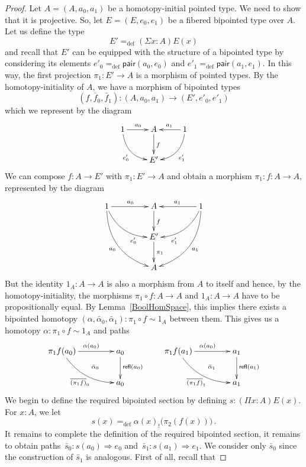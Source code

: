 \documentclass[10pt,a4paper,oneside,reqno]{amsart}
\numberwithin{equation}{section}
\theoremstyle{mythm}
\theoremstyle{mydef}
\theoremstyle{myrmk}
\newcommand{\peq}{\Rightarrow}
\newcommand{\defeq}{=_{\mathrm{def}}}
\newcommand{\co}{\colon}
\newcommand{\pair}{\mathsf{pair}}
\newcommand{\refl}{\mathsf{refl}}
\begin{document}
\begin{proof}
Let $A = (A, a_0, a_1)$ be a homotopy-initial pointed type. We need to show that it is projective. So, let $E = (E, e_0, e_1)$ be a fibered 
bipointed type over $A$. Let us define the type 
\[
E' \defeq (\Sigma x \co A) E(x) 
\]
and recall that $E'$ can be equipped with the structure of a bipointed type by considering its elements $e'_0 \defeq \pair(a_0, e_0)$ and $e'_1 \defeq \pair(a_1, e_1)$. In this way,  the first projection $\pi_1 \co E' \to A$ is a morphism of pointed types. By the homotopy-initiality of $A$, we have a morphism of bipointed types
\[
(f, \bar{f}_0, \bar{f}_1) \co (A, a_0, a_1)  \to (E', e'_0, e'_1) 
\]
which we represent by the diagram
\[
\xymatrix{
1 \ar@/_1pc/[dr]_{e'_0} \ar[r]^{a_0} & A  \ar[d]^f & 1 \ar[l]_{a_1} \ar@/^1pc/[dl]^{e'_1} \\
 & E' & }
 \]
 We can compose $f \co A \to E'$ with $\pi_1 \co E' \to A$ and obtain a morphism $\pi_1 \co f \co A \to A$, represented by the diagram
  \[
\xymatrix@C=1.5cm{
1 \ar@/_1pc/[dr]_(.7){e'_0} \ar[r]^{a_0} \ar@/_1.5pc/[ddr]_{a_0}  & A  \ar[d]^f & 1 \ar[l]_{a_1} \ar@/^1pc/[dl]^(.7){e'_1} \ar@/^1.5pc/[ddl]^{a_1}  \\
 & E' \ar[d]^{\pi_1} & \\
 & A &  }
 \]
But the identity $1_A \co A \to A$ is also a morphism from $A$ to itself and hence, by the homotopy-initiality, the morphisms $\pi_1 \circ f \co A \to A$
and $1_A \co A \to A$ have to be propositionally equal. By Lemma~\ref{BoolHomSpace}, this implies there exists a bipointed homotopy $(\alpha,
\bar{\alpha}_0,\bar{\alpha}_1) \co \pi_1 \circ f \sim 1_A$ between them. This gives us a homotopy $\alpha \co \pi_1 \circ f \sim 1_A$ and paths
\[
\xymatrix@C=1.5cm{
\pi_1 f (a_0) \ar[r]^{\alpha(a_0)} \ar@/_1pc/[dr]_{\overline{(\pi_1 f)}_0} \ar@{}[dr]|{\quad \bar{\alpha}_0}  & a_0 \ar[d]^{\refl(a_0)} \\
 & a_0 } \qquad
 \xymatrix@C=1.5cm{
\pi_1 f (a_1) \ar[r]^{\alpha(a_0)} \ar@/_1pc/[dr]_{\overline{(\pi_1 f)}_1} \ar@{}[dr]|{\quad \bar{\alpha}_1}  & a_1 \ar[d]^{\refl(a_1)} \\
 & a_1 }
\]
We begin to define the required bipointed section by defining  $s \co (\Pi x \co A) E(x)$. For $x \co A$, we let
\begin{equation}
\label{equ:defreqsection}
s(x) \defeq \alpha(x)_{!} \big( \pi_2(f(x)) \big) \, . 
\end{equation}
It remains to complete the definition of the required bipointed section, it remains to obtain paths~$\bar{s}_0 \co s(a_0)  \peq e_0$ and~$\bar{s}_1 \co s(a_1) \peq e_1$. We consider only $\bar{s}_0$ since the construction of $\bar{s}_1$ is  analogous. First of all, recall that 

\end{proof}
\end{document}
